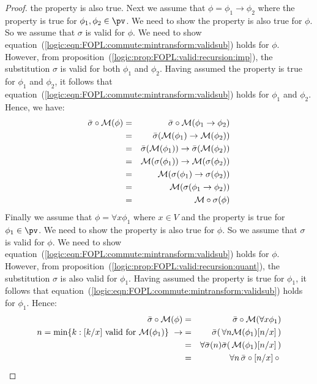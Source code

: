 \begin{proof}
the property is also true. Next we assume that
$\phi=\phi_{1}\to\phi_{2}$ where the property is true for
$\phi_{1},\phi_{2}\in\pv$. We need to show the property is also true
for $\phi$. So we assume that $\sigma$ is valid for $\phi$. We need
to show
equation~(\ref{logic:eqn:FOPL:commute:mintransform:validsub}) holds
for $\phi$. However, from
proposition~(\ref{logic:prop:FOPL:valid:recursion:imp}), the
substitution $\sigma$ is valid for both $\phi_{1}$ and $\phi_{2}$.
Having assumed the property is true for $\phi_{1}$ and $\phi_{2}$,
it follows that
equation~(\ref{logic:eqn:FOPL:commute:mintransform:validsub}) holds
for $\phi_{1}$ and $\phi_{2}$. Hence, we have:
    \begin{eqnarray*}
    \bar{\sigma}\circ{\cal M}(\phi)
    &=&\bar{\sigma}\circ{\cal M}(\phi_{1}\to\phi_{2})\\
    &=&\bar{\sigma}({\cal M}(\phi_{1})\to{\cal M}(\phi_{2}))\\
    &=&\bar{\sigma}({\cal M}(\phi_{1}))\to\bar{\sigma}({\cal
    M}(\phi_{2}))\\
    &=&{\cal M}(\sigma(\phi_{1}))\to{\cal
    M}(\sigma(\phi_{2}))\\
    &=&{\cal M}(\sigma(\phi_{1})\to\sigma(\phi_{2}))\\
    &=&{\cal M}(\sigma(\phi_{1}\to\phi_{2}))\\
    &=&{\cal M}\circ\sigma(\phi)
    \end{eqnarray*}
Finally we assume that $\phi=\forall x\phi_{1}$ where $x\in V$ and
the property is true for $\phi_{1}\in\pv$. We need to show the
property is also true for $\phi$. So we assume that $\sigma$ is
valid for $\phi$. We need to show
equation~(\ref{logic:eqn:FOPL:commute:mintransform:validsub}) holds
for $\phi$. However, from
proposition~(\ref{logic:prop:FOPL:valid:recursion:quant}), the
substitution $\sigma$ is also valid for $\phi_{1}$. Having assumed
the property is true for $\phi_{1}$, it follows that
equation~(\ref{logic:eqn:FOPL:commute:mintransform:validsub}) holds
for $\phi_{1}$. Hence:
    \begin{eqnarray*}
    \bar{\sigma}\circ{\cal M}(\phi)&=&\bar{\sigma}\circ{\cal M}(\forall
    x\phi_{1})\\
    \mbox{$n=\min\{k:[k/x]\mbox{ valid for }{\cal M}(\phi_{1})\}$}\
    \rightarrow
    &=&\bar{\sigma}(\,\forall n{\cal M}(\phi_{1})[n/x]\,)\\
    &=&\forall \bar{\sigma}(n)\bar{\sigma}(\,{\cal
    M}(\phi_{1})[n/x]\,)\\
    &=&\forall n\,\bar{\sigma}\circ [n/x]\circ{\cal
}
\end{eqnarray*}
\end{proof}
